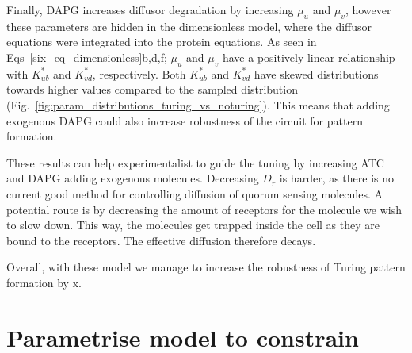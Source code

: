 Finally, DAPG increases diffusor degradation by increasing $\mu_u$ and $\mu_v$, however these parameters are hidden in the dimensionless model, where the diffusor equations were integrated into the protein equations.
As seen in Eqs~\ref{six_eq_dimensionless}b,d,f; $\mu_u$ and $\mu_v$ have a positively linear relationship with $K_{ub}^*$ and $K_{vd}^*$, respectively.
Both $K_{ub}^*$ and $K_{vd}^*$ have skewed distributions towards higher values compared to the sampled distribution (Fig.~\ref{fig:param_distributions_turing_vs_noturing}).
This means that adding exogenous DAPG could also increase robustness of the circuit for pattern formation. %

These results can help experimentalist to guide the tuning by increasing ATC and DAPG adding exogenous molecules.
Decreasing $D_{r}$ is harder, as there is no current good method for controlling diffusion of quorum sensing molecules.
A potential route is by decreasing the amount of receptors for the molecule we wish to slow down.
This way, the molecules get trapped inside the cell as they are bound to the receptors.
The effective diffusion therefore decays. %

Overall, with these model we manage to increase the robustness of Turing pattern formation by x. 
\section{Parametrise model to constrain}
%
